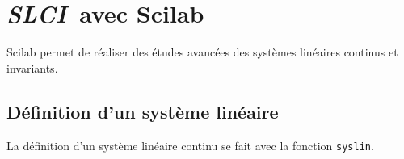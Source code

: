 \section{\emph{{\scshape SLCI}}~avec Scilab}
Scilab permet de réaliser des études avancées des systèmes linéaires continus 
et invariants.
\subsection{Définition d'un système linéaire}
La définition d'un système linéaire continu se fait avec la fonction 
\verb?syslin?. 
